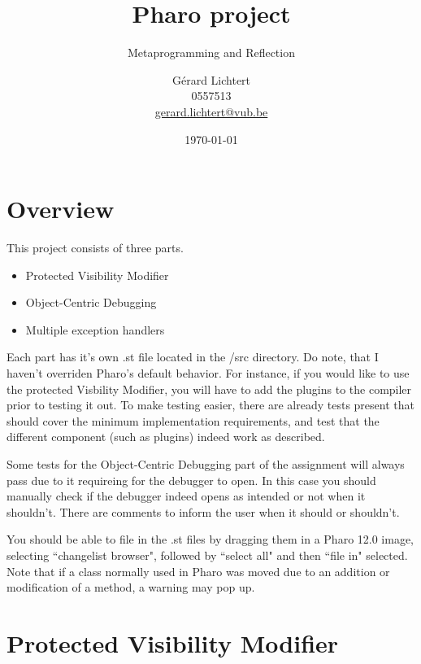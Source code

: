 \documentclass[a4paper]{article}
\title{Pharo project}
\subtitle{Metaprogramming and Reflection}
\author{Gérard Lichtert\\
        0557513\\
    \href{mailto:gerard.lichtert@vub.be}{gerard.lichtert@vub.be}
}
\date{\today}
\begin{document}
\maketitle
\tableofcontents
\newpage
\raggedright

\section{Overview}
This project consists of three parts.
\begin{itemize}
	\item Protected Visibility Modifier
	\item Object-Centric Debugging
	\item Multiple exception handlers
\end{itemize}
Each part has it's own .st file located in the /src directory.
Do note, that I haven't overriden Pharo's default behavior. For instance, if you
would like to use the protected Visbility Modifier, you will have to add the
plugins to the compiler prior to testing it out. To make testing easier, there
are already tests present that should cover the minimum implementation
requirements, and test that the different component (such as plugins) indeed
work as described.
\par
Some tests for the Object-Centric Debugging part of the assignment will always
pass due to it requireing for the debugger to open. In this case you should
manually check if the debugger indeed opens as intended or not when it
shouldn't. There are comments to inform the user when it should or shouldn't.
\par
You should be able to file in the .st files by dragging them in a Pharo 12.0
image, selecting ``changelist browser", followed by ``select all" and then
``file in" selected. Note that if a class normally used in Pharo was moved due to
an addition or modification of a method, a warning may pop up.
\section{Protected Visibility Modifier}
\end{document}
